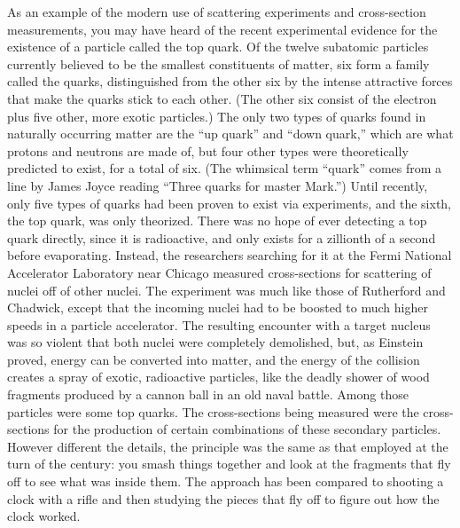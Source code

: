         As an example of the modern use of scattering experiments
        and cross-section measurements, you may have heard of the
        recent experimental evidence for the existence of a particle
        called the top quark. Of the twelve subatomic particles
        currently believed to be the smallest constituents of
        matter, six form a family called the quarks, distinguished
        from the other six by the intense attractive forces that
        make the quarks stick to each other. (The other six consist
        of the electron plus five other, more exotic particles.) The
        only two types of quarks found in naturally occurring matter
        are the ``up quark'' and ``down quark,'' which are what
        protons and neutrons are made of, but four other types were
        theoretically predicted to exist, for a total of six. (The
        whimsical term ``quark'' comes from a line by James Joyce
        reading ``Three quarks for master Mark.'') Until recently,
        only five types of quarks had been proven to exist via
        experiments, and the sixth, the top quark, was only
        theorized. There was no hope of ever detecting a top quark
        directly, since it is radioactive, and only exists for a
        zillionth of a second before evaporating. Instead, the
        researchers searching for it at the Fermi National
        Accelerator Laboratory near Chicago measured cross-sections
        for scattering of nuclei off of other nuclei. The experiment
        was much like those of Rutherford and Chadwick, except that
        the incoming nuclei had to be boosted to much higher speeds
        in a particle accelerator. The resulting encounter with a
        target nucleus was so violent that both nuclei were
        completely demolished, but, as Einstein proved, energy can
        be converted into matter, and the energy of the collision
        creates a spray of exotic, radioactive particles, like the
        deadly shower of wood fragments produced by a cannon ball in
        an old naval battle. Among those particles were some top
        quarks. The cross-sections being measured were the
        cross-sections for the production of certain combinations of
        these secondary particles. However different the details,
        the principle was the same as that employed at the turn of
        the century: you smash things together and look at the
        fragments that fly off to see what was inside them. The
        approach has been compared to shooting a clock with a rifle
        and then studying the pieces that fly off to figure out
        how the clock worked.


